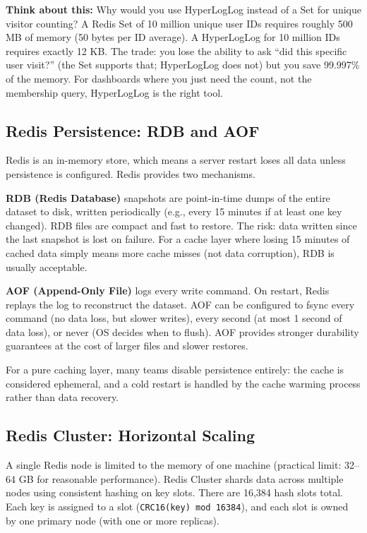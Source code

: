 \documentclass[11pt,a4paper]{article}
\begin{document}
\begin{thinkbox}
\textbf{Think about this:} Why would you use HyperLogLog instead of a Set for unique visitor counting? A Redis Set of 10 million unique user IDs requires roughly 500 MB of memory (50 bytes per ID average). A HyperLogLog for 10 million IDs requires exactly 12 KB. The trade: you lose the ability to ask ``did this specific user visit?'' (the Set supports that; HyperLogLog does not) but you save 99.997\% of the memory. For dashboards where you just need the count, not the membership query, HyperLogLog is the right tool.
\end{thinkbox}

\subsection{Redis Persistence: RDB and AOF}

Redis is an in-memory store, which means a server restart loses all data unless persistence is configured. Redis provides two mechanisms.

\textbf{RDB (Redis Database)} snapshots are point-in-time dumps of the entire dataset to disk, written periodically (e.g., every 15 minutes if at least one key changed). RDB files are compact and fast to restore. The risk: data written since the last snapshot is lost on failure. For a cache layer where losing 15 minutes of cached data simply means more cache misses (not data corruption), RDB is usually acceptable.

\textbf{AOF (Append-Only File)} logs every write command. On restart, Redis replays the log to reconstruct the dataset. AOF can be configured to fsync every command (no data loss, but slower writes), every second (at most 1 second of data loss), or never (OS decides when to flush). AOF provides stronger durability guarantees at the cost of larger files and slower restores.

For a pure caching layer, many teams disable persistence entirely: the cache is considered ephemeral, and a cold restart is handled by the cache warming process rather than data recovery.

\subsection{Redis Cluster: Horizontal Scaling}

A single Redis node is limited to the memory of one machine (practical limit: 32--64 GB for reasonable performance). Redis Cluster shards data across multiple nodes using consistent hashing on key slots. There are 16,384 hash slots total. Each key is assigned to a slot (\texttt{CRC16(key) mod 16384}), and each slot is owned by one primary node (with one or more replicas).
\end{document}
